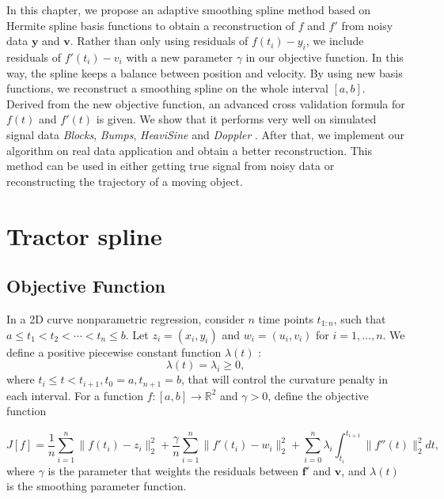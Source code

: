 In this chapter, we propose an adaptive smoothing spline method based on Hermite spline basis functions to obtain a reconstruction of $f$ and $f'$ from noisy data $\mathbf{y}$ and $\mathbf{v}$. Rather than only using residuals of $f(t_i)-y_i$, we include residuals of $f'(t_i)-v_i$ with a new parameter $\gamma$ in our objective function. In this way, the spline keeps a balance between position and velocity. By using new basis functions, we reconstruct a smoothing spline on the whole interval $[a,b]$. Derived from the new objective function, an advanced cross validation formula for $f(t)$ and $f'(t)$ is given. We show that it performs very well on simulated signal data \textit{Blocks}, \textit{Bumps}, \textit{HeaviSine} and \textit{Doppler} \cite{donoho1994ideal}. After that, we implement our algorithm on real data application and obtain a better reconstruction. This method can be used in either getting true signal from noisy data or reconstructing the trajectory of a moving object. 


\section{Tractor spline}\label{ChapterTractorSpline}

\subsection{Objective Function}

In a 2D curve nonparametric regression, consider $n$  time points $t_{1:n}$, such that $a \leq t_1<t_2< \cdots < t_n \leq b$. Let $z_i=(x_i,y_i)$ and $w_i=(u_i,v_i)$ for $i=1, \ldots, n$. We define a positive piecewise constant function $\lambda(t)$ :
\begin{equation}
\lambda(t) = \lambda_i \geq 0,
\end{equation}
where $t_i \leq t<t_{i+1}, t_0=a, t_{n+1}=b$, that will control the curvature penalty in each interval. For a function $f:[a,b]\longrightarrow \mathbb{R}^2$ and $\gamma>0$, define the objective function 

 \begin{equation}\label{tractorsplineObjective}
J[f]= \frac{1}{n} \sum_{i=1}^{n} \lVert f(t_i)-z_i\rVert_2^2 + \frac{\gamma}{n} \sum_{i=1}^{n} \lVert f'(t_i)-w_i \rVert_2^2 +\sum_{i=0}^{n} \lambda_i\int_{t_i}^{t_{i+1}} \lVert f''(t)\rVert_2^2 dt,
\end{equation}
where $\gamma$ is the parameter that weights the residuals between $\mathbf{f}'$ and $\mathbf{v}$, and $\lambda(t)$ is the smoothing parameter function.

